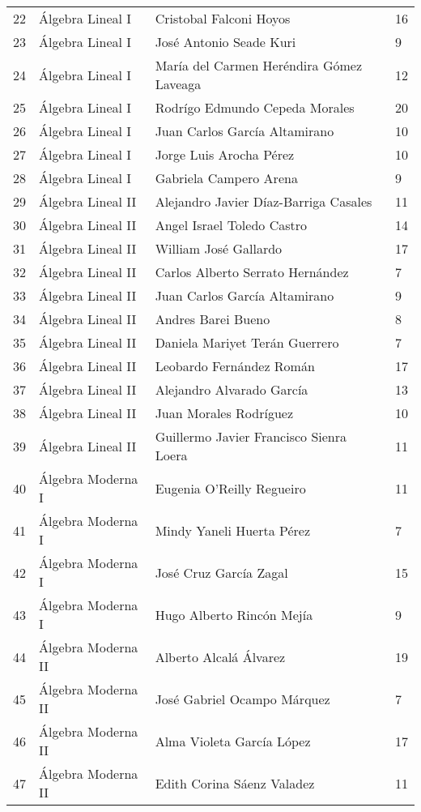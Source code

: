 \begin{table}[ht]
\begin{tabular}{rlll}
  22 & Álgebra Lineal I & Cristobal Falconi Hoyos & 16 \\ 
  23 & Álgebra Lineal I & José Antonio Seade Kuri & 9 \\ 
  24 & Álgebra Lineal I & María del Carmen Heréndira Gómez Laveaga & 12 \\ 
  25 & Álgebra Lineal I & Rodrígo Edmundo Cepeda Morales & 20 \\ 
  26 & Álgebra Lineal I & Juan Carlos García Altamirano & 10 \\ 
  27 & Álgebra Lineal I & Jorge Luis Arocha Pérez & 10 \\ 
  28 & Álgebra Lineal I & Gabriela Campero Arena & 9 \\ 
  29 & Álgebra Lineal II & Alejandro Javier Díaz-Barriga Casales & 11 \\ 
  30 & Álgebra Lineal II & Angel Israel Toledo Castro & 14 \\ 
  31 & Álgebra Lineal II & William José Gallardo & 17 \\ 
  32 & Álgebra Lineal II & Carlos Alberto Serrato Hernández & 7 \\ 
  33 & Álgebra Lineal II & Juan Carlos García Altamirano & 9 \\ 
  34 & Álgebra Lineal II & Andres Barei Bueno & 8 \\ 
  35 & Álgebra Lineal II & Daniela Mariyet Terán Guerrero & 7 \\ 
  36 & Álgebra Lineal II & Leobardo Fernández Román & 17 \\ 
  37 & Álgebra Lineal II & Alejandro Alvarado García & 13 \\ 
  38 & Álgebra Lineal II & Juan Morales Rodríguez & 10 \\ 
  39 & Álgebra Lineal II & Guillermo Javier Francisco Sienra Loera & 11 \\ 
  40 & Álgebra Moderna I & Eugenia O'Reilly Regueiro & 11 \\ 
  41 & Álgebra Moderna I & Mindy Yaneli Huerta Pérez & 7 \\ 
  42 & Álgebra Moderna I & José Cruz García Zagal & 15 \\ 
  43 & Álgebra Moderna I & Hugo Alberto Rincón Mejía & 9 \\ 
  44 & Álgebra Moderna II & Alberto Alcalá Álvarez & 19 \\ 
  45 & Álgebra Moderna II & José Gabriel Ocampo Márquez & 7 \\ 
  46 & Álgebra Moderna II & Alma Violeta García López & 17 \\ 
  47 & Álgebra Moderna II & Edith Corina Sáenz Valadez & 11 \\ 

\end{tabular}
\end{table}
